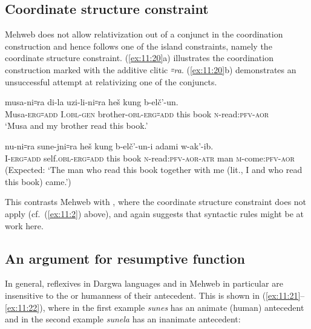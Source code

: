 ﻿\documentclass[output=paper]{langsci/langscibook}
\begin{document}

\subsection{Coordinate structure constraint}


Mehweb does not allow relativization out of a conjunct in the
coordination construction and hence follows one of the island
constraints, namely the coordinate structure constraint. (\ref{ex:11:20}a)
illustrates the coordination construction marked with the additive
clitic \emph{꞊ra}. (\ref{ex:11:20}b) demonstrates an unsuccessful attempt at
relativizing one of the conjuncts.

\ea \label{ex:11:20} %
\ea %
\gll musa-ni꞊ra di-la uzi-li-ni꞊ra heš kung   b-elč'-un.\\
  Musa-\textsc{erg}꞊\textsc{add} I.\textsc{obl}-\textsc{gen} brother-\textsc{obl}-\textsc{erg}꞊\textsc{add}   this book   \textsc{n}-read:\textsc{pfv}-\textsc{aor}\\
\glt
  `Musa and my brother read this book.'

  \ex %
  \gll *nu-ni꞊ra sune-jni꞊ra heš kung b-elč'-un-i  adami w-ak'-ib.\\
  I-\textsc{erg}꞊\textsc{add} self.\textsc{obl}-\textsc{erg}꞊\textsc{add} this book   \textsc{n}-read:\textsc{pfv}-\textsc{aor}-\textsc{atr}   man \textsc{m}-come:\textsc{pfv}-\textsc{aor}\\
  \glt
  (Expected: `The man who read this book together with me (lit., I and
  who read this book) came.')
  \z
  \z

This contrasts Mehweb with , where the coordinate structure
constraint does not apply (cf.\ (\ref{ex:11:2}) above), and again suggests that
syntactic rules might be at work here.


\subsection{An argument for resumptive function}


In general, reflexives in Dargwa languages and in Mehweb in particular
are insensitive to the  or humanness of their antecedent. This is
shown in (\ref{ex:11:21}–\ref{ex:11:22}), where in the first example \emph{sunes} has an
animate (human) antecedent and in the second example \emph{sunela} has
an inanimate antecedent:
\end{document}
